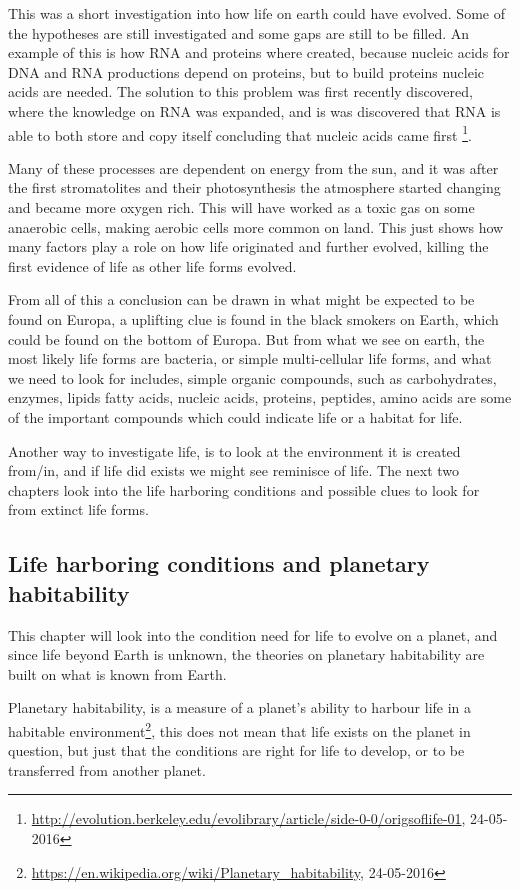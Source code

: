 This was a short investigation into how life on earth could have evolved. Some of the hypotheses are still investigated and some gaps are still to be filled. An example of this is how RNA and proteins where created, because nucleic acids for DNA and RNA productions depend on proteins, but to build proteins nucleic acids are needed. The solution to this problem was first recently discovered, where the knowledge on RNA was expanded, and is was discovered that RNA is able to both store and copy itself concluding that nucleic acids came first \footnote{\url{http://evolution.berkeley.edu/evolibrary/article/side-0-0/origsoflife-01}, 24-05-2016}.

Many of these processes are dependent on energy from the sun, and it was after the first stromatolites and their photosynthesis the atmosphere started changing and became more oxygen rich. This will have worked as a toxic gas on some anaerobic cells, making aerobic cells more common on land. This just shows how many factors play a role on how life originated and further evolved, killing the first evidence of life as other life forms evolved.

From all of this a conclusion can be drawn in what might be expected to be found on Europa, a uplifting clue is found in the black smokers on Earth, which could be found on the bottom of Europa. But from what we see on earth, the most likely life forms are bacteria, or simple multi-cellular life forms, and what we need to look for includes, simple organic compounds, such as carbohydrates, enzymes, lipids fatty acids, nucleic acids, proteins, peptides, amino acids are some of the important compounds which could indicate life or a habitat for life.

Another way to investigate life, is to look at the environment it is created from/in, and if life did exists we might see reminisce of life. The next two chapters look into the life harboring conditions and possible clues to look for from extinct life forms.

\subsection{Life harboring conditions and planetary habitability}

This chapter will look into the condition need for life to evolve on a planet, and since life beyond Earth is unknown, the theories on planetary habitability are built on what is known from Earth.

Planetary habitability, is a measure of a planet's ability to harbour life in a habitable environment\footnote{\url{https://en.wikipedia.org/wiki/Planetary_habitability}, 24-05-2016}, this does not mean that life exists on the planet in question, but just that the conditions are right for life to develop, or to be transferred from another planet.

